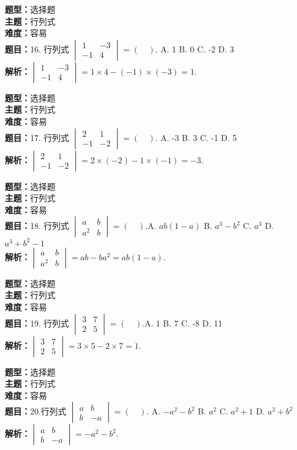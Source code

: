 \documentclass{ctexart}
\newenvironment{question}[5]{%
	\noindent\textbf{题型：}#1\\
	\textbf{主题：}#2\\
	\textbf{难度：}#3\\
	\textbf{题目：}#4\\
	\textbf{解析：}#5\\
	\vspace{1em}
}{}
\begin{document}
	\begin{question}
		{选择题}
		{行列式}
		{容易}
		{16. 行列式 \(\begin{vmatrix} 1 & -3 \\ -1 & 4\end{vmatrix}=(\quad). \) A.  1 \quad B.  0 \quad C. -2 \quad D.  3}
		{\(\begin{vmatrix} 1 & -3 \\ -1 & 4\end{vmatrix}=1 \times 4-(-1) \times(-3)=1.\)}
	\end{question}
	
	\begin{question}
		{选择题}
		{行列式}
		{容易}
		{17. 行列式 \(\begin{vmatrix} 2 & 1 \\ -1 & -2\end{vmatrix}=(\quad). \) A. -3 \quad B.  3 \quad C. -1 \quad D.  5}
		{\(\begin{vmatrix} 2 & 1 \\ -1 & -2\end{vmatrix}=2 \times(-2)-1 \times(-1)=-3.\)}
	\end{question}
	
	\begin{question}
		{选择题}
		{行列式}
		{容易}
		{18. 行列式 \(\begin{vmatrix} a & b \\ a^2 & b\end{vmatrix}=(\quad). \)A. \(a b(1-a)\) \quad B. \(a^3-b^2\) \quad C. \(a^3\) \quad D. \(a^3+b^2-1\)}
		{\(\begin{vmatrix} a & b \\ a^2 & b\end{vmatrix}=a b-b a^2=a b(1-a).\)}
	\end{question}
	
	
	\begin{question}
		{选择题}
		{行列式}
		{容易}
		{19. 行列式 \(\begin{vmatrix} 3 & 7 \\ 2 & 5\end{vmatrix}=(\quad). \)A.  1 \quad B.  7 \quad C. -8 \quad D.  11}
		{\(\begin{vmatrix} 3 & 7 \\ 2 & 5\end{vmatrix}=3 \times 5-2 \times 7=1\).}
	\end{question}
	
	\begin{question}
		{选择题}
		{行列式}
		{容易}
		{20.行列式 \(\begin{vmatrix} a & b \\ b & -a\end{vmatrix}=(\quad).\)
			A. \(-a^2-b^2\) \quad B. \(a^2\) \quad C. \(a^2+1\) \quad D. \(a^2+b^2\)}
		{\(\begin{vmatrix} a & b \\ b & -a\end{vmatrix}=-a^2-b^2. \)}
	\end{question}
	
\end{document}
